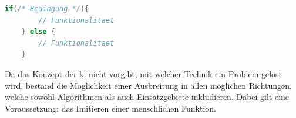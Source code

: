 \begin{lstlisting}[language=Java,caption={Zuordnung mit einer if/else-Verzeigung},label={lst:Zuordnung}]
    if(/* Bedingung */){
        // Funktionalitaet
    } else {
        // Funktionalitaet
    }
\end{lstlisting}

Da das Konzept der \gls{ki} nicht vorgibt, mit welcher Technik ein Problem gelöst wird, bestand die Möglichkeit einer Ausbreitung in allen möglichen Richtungen, welche sowohl Algorithmen als auch Einsatzgebiete inkludieren. Dabei gilt eine Voraussetzung: das Imitieren einer menschlichen Funktion.